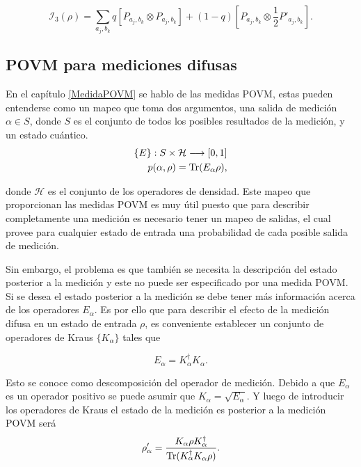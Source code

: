 \begin{equation}
    \mathcal{I}_3(\rho)=\sum_{a_j,b_k} q [P_{a_j,b_k}\otimes P_{a_j,b_k}]+ (1-q)[P_{a_j,b_k}\otimes \frac{1}{2} P'_{a_j,b_k}].
\end{equation}  

\subsection{POVM para mediciones difusas}

En el capítulo {\ref{MedidaPOVM}} se hablo de las medidas POVM, estas pueden entenderse como un mapeo que toma dos argumentos, una salida de medición $\alpha \in S $, donde $S$ es el conjunto de todos los posibles resultados de la medición, y un estado cuántico.
\begin{equation}\begin{split}
    \{E\}:S\times \mathcal{H}\longrightarrow [0,1]\\
    p(\alpha,\rho)={\rm Tr}(E_\alpha\rho),
\end{split}\end{equation}

donde $\mathcal{H}$ es el conjunto de los operadores de densidad. Este mapeo que proporcionan las medidas POVM es muy útil puesto que para describir completamente una medición es necesario tener un mapeo de salidas, el cual provee para cualquier estado de entrada una probabilidad de cada posible salida de medición. 


Sin embargo, el problema es que también se necesita la descripción del estado posterior a la medición y este no puede ser especificado por una medida POVM\@. Si se desea el estado posterior a la medición se debe tener más información acerca de los operadores $E_\alpha$. Es por ello que para describir el efecto de la medición difusa en un estado de entrada $\rho$, es conveniente establecer un conjunto de operadores de Kraus $\{K_\alpha\}$ tales que 

\begin{equation}E_\alpha=K_\alpha^\dagger K_\alpha.\end{equation}

Esto se conoce como descomposición del operador de medición. Debido a que $E_\alpha$ es un operador positivo se puede asumir que $K_\alpha=\sqrt{E_\alpha}$. Y luego de introducir los operadores de Kraus el estado de la medición es posterior a la medición POVM será 
\begin{equation}\rho'_\alpha=\dfrac{K_\alpha \rho K_\alpha^\dagger}{{\rm Tr}(K_\alpha^\dagger K_\alpha \rho)}.\end{equation}

